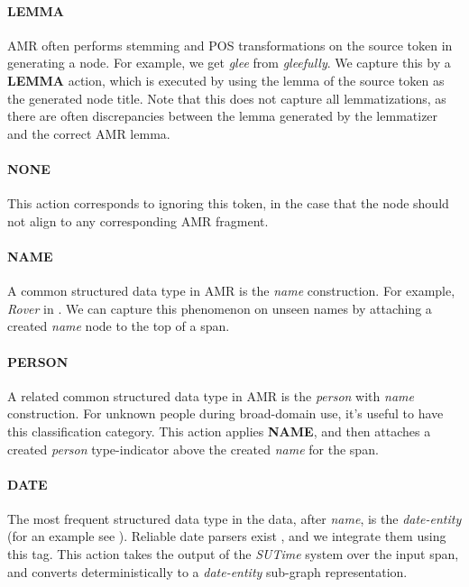 \documentclass[11pt]{article}
\newcommand\w[1]{\textit{#1}} %
\newcommand\n[1]{\textit{#1}} %
\begin{document}
\paragraph{LEMMA} AMR often performs stemming and POS transformations on the source token in generating a node. 
For example, we get \n{glee} from \w{gleefully}.
We capture this by a \textbf{LEMMA} action, which is executed by using the lemma of the source token as the generated node title.
Note that this does not capture all lemmatizations, as there are often discrepancies
  between the lemma generated by the lemmatizer and the correct AMR lemma.

\paragraph{NONE} This action corresponds to ignoring this token, in the case that
  the node should not align to any corresponding AMR fragment.

\paragraph{NAME} A common structured data type in AMR is the \n{name} construction. 
For example, \w{Rover} in .
We can capture this phenomenon on unseen names by attaching a created \n{name} node to the top of a span.

\paragraph{PERSON} A related common structured data type in AMR is the \n{person} with \n{name} construction. 
For unknown people during broad-domain use, it's useful to have this classification category.
This action applies \textbf{NAME}, and then attaches a created \n{person} type-indicator above the created \n{name} for the span.

\paragraph{DATE} The most frequent structured data type in the data, after \n{name}, is the \n{date-entity} (for an example see ).
Reliable date parsers exist \cite{2012chang-temporal}, and we integrate them using this tag.
This action takes the output of the \textit{SUTime} system over the input span, and converts deterministically to a \n{date-entity} sub-graph representation.
\end{document}
